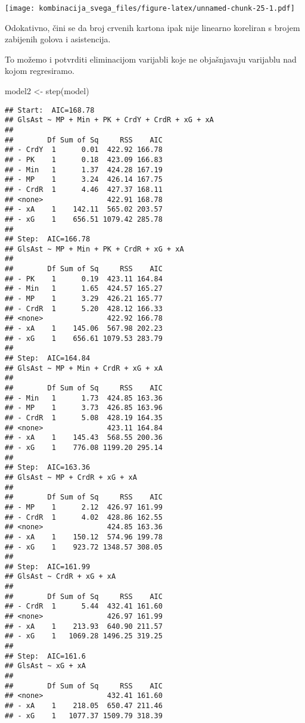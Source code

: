 \documentclass[
]{article}
\newenvironment{Shaded}{\begin{snugshade}}{\end{snugshade}}
\newcommand{\FunctionTok}[1]{\textcolor[rgb]{0.00,0.00,0.00}{#1}}
\newcommand{\NormalTok}[1]{#1}
\newcommand{\OtherTok}[1]{\textcolor[rgb]{0.56,0.35,0.01}{#1}}
\begin{document}
\texttt{[image: kombinacija\_svega\_files/figure-latex/unnamed-chunk-25-1.pdf]}

Odokativno, čini se da broj crvenih kartona ipak nije linearno koreliran
s brojem zabijenih golova i asistencija.

To možemo i potvrditi eliminacijom varijabli koje ne objašnjavaju
varijablu nad kojom regresiramo.

\begin{Shaded}
\begin{Highlighting}[]
\NormalTok{model2 }\OtherTok{\textless{}{-}} \FunctionTok{step}\NormalTok{(model)}
\end{Highlighting}
\end{Shaded}

\begin{verbatim}
## Start:  AIC=168.78
## GlsAst ~ MP + Min + PK + CrdY + CrdR + xG + xA
## 
##        Df Sum of Sq     RSS    AIC
## - CrdY  1      0.01  422.92 166.78
## - PK    1      0.18  423.09 166.83
## - Min   1      1.37  424.28 167.19
## - MP    1      3.24  426.14 167.75
## - CrdR  1      4.46  427.37 168.11
## <none>               422.91 168.78
## - xA    1    142.11  565.02 203.57
## - xG    1    656.51 1079.42 285.78
## 
## Step:  AIC=166.78
## GlsAst ~ MP + Min + PK + CrdR + xG + xA
## 
##        Df Sum of Sq     RSS    AIC
## - PK    1      0.19  423.11 164.84
## - Min   1      1.65  424.57 165.27
## - MP    1      3.29  426.21 165.77
## - CrdR  1      5.20  428.12 166.33
## <none>               422.92 166.78
## - xA    1    145.06  567.98 202.23
## - xG    1    656.61 1079.53 283.79
## 
## Step:  AIC=164.84
## GlsAst ~ MP + Min + CrdR + xG + xA
## 
##        Df Sum of Sq     RSS    AIC
## - Min   1      1.73  424.85 163.36
## - MP    1      3.73  426.85 163.96
## - CrdR  1      5.08  428.19 164.35
## <none>               423.11 164.84
## - xA    1    145.43  568.55 200.36
## - xG    1    776.08 1199.20 295.14
## 
## Step:  AIC=163.36
## GlsAst ~ MP + CrdR + xG + xA
## 
##        Df Sum of Sq     RSS    AIC
## - MP    1      2.12  426.97 161.99
## - CrdR  1      4.02  428.86 162.55
## <none>               424.85 163.36
## - xA    1    150.12  574.96 199.78
## - xG    1    923.72 1348.57 308.05
## 
## Step:  AIC=161.99
## GlsAst ~ CrdR + xG + xA
## 
##        Df Sum of Sq     RSS    AIC
## - CrdR  1      5.44  432.41 161.60
## <none>               426.97 161.99
## - xA    1    213.93  640.90 211.57
## - xG    1   1069.28 1496.25 319.25
## 
## Step:  AIC=161.6
## GlsAst ~ xG + xA
## 
##        Df Sum of Sq     RSS    AIC
## <none>               432.41 161.60
## - xA    1    218.05  650.47 211.46
## - xG    1   1077.37 1509.79 318.39
\end{verbatim}
\end{document}
